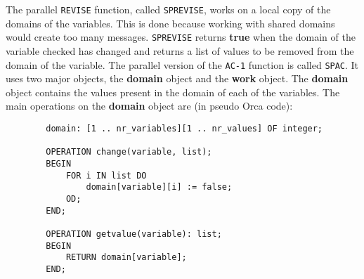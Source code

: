 \documentclass[a4paper,11pt]{article}
\begin{document}
The parallel
{\tt REVISE} function, called {\tt SPREVISE}, works on a local copy of
the domains of the variables. This is done because working with shared
domains would create too many messages. {\tt SPREVISE} 
returns {\bf true} when the domain of the
variable checked has changed and returns a list of values to be
removed from the domain of the variable. The parallel version of the
{\tt AC-1} function is called {\tt SPAC}.
It uses two major objects, the {\bf domain} object and the {\bf work}
object.
The {\bf domain} object contains the values present in the
domain of each of the variables. The main operations on the {\bf domain}
object are (in pseudo Orca code):
\begin{verbatim}
        domain: [1 .. nr_variables][1 .. nr_values] OF integer;

        OPERATION change(variable, list);
        BEGIN
            FOR i IN list DO
                domain[variable][i] := false;
            OD;
        END;

        OPERATION getvalue(variable): list;
        BEGIN
            RETURN domain[variable];
        END;
\end{verbatim}
\end{document}
